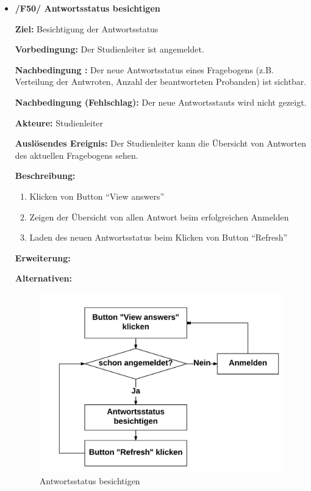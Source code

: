 \documentclass[a4paper]{scrreprt}
\begin{document}
\begin{itemize}
                \item \textbf{/F50/ \gls{Antwortsstatus} besichtigen}
                \par \textbf{Ziel: }Besichtigung der Antwortsstatus
                \par \textbf{Vorbedingung: }Der \gls{Studienleiter} ist angemeldet.
                \par \textbf{Nachbedingung : }Der neue Antwortsstatus eines Fragebogens (z.B. Verteilung der Antwroten, Anzahl der beantworteten \gls{Proband}en) ist sichtbar.
                \par \textbf{Nachbedingung (Fehlschlag): }Der neue Antwortsstauts wird nicht gezeigt.
                \par \textbf{Akteure: }\gls{Studienleiter}
                \par \textbf{Auslösendes Ereignis: }Der \gls{Studienleiter} kann die \"Ubersicht von Antworten des aktuellen Fragebogens sehen.
                \par \textbf{Beschreibung: }
                \begin{enumerate}
                    \item Klicken von Button ``View answers''
                    \item Zeigen der \"Ubersicht von allen Antwort beim erfolgreichen Anmelden
                    \item Laden des neuen Antwortsstatus beim Klicken von Button ``Refresh''
                \end{enumerate}
                \par \textbf{Erweiterung: }
                \par \textbf{Alternativen: }
                \begin{figure}[H]
                    \centering
                    \includegraphics[scale=0.9]{Antwortsstatus_besichtigen.jpeg}
                    \caption{Antwortsstatus besichtigen}
                \end{figure}
                \newpage


\end{itemize}
\end{document}
